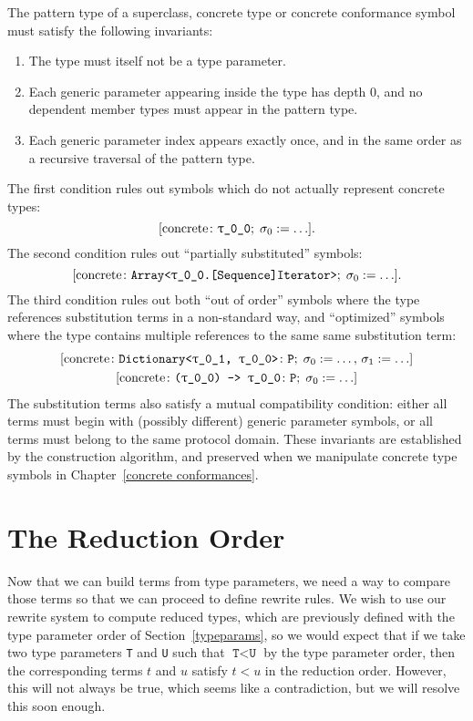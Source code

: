 \documentclass[../generics]{subfiles}
\begin{document}
The pattern type of a superclass, concrete type or concrete conformance symbol must satisfy the following invariants:
\begin{enumerate}
\item The type must itself not be a type parameter.
\item Each generic parameter appearing inside the type has depth 0, and no dependent member types must appear in the pattern type.
\item Each generic parameter index appears exactly once, and in the same order as a recursive traversal of the pattern type.
\end{enumerate}
The first condition rules out symbols which do not actually represent concrete types:
\[[\mathrm{concrete}\colon \texttt{$\uptau$\_0\_0};\; \sigma_0 := \ldots].\]
The second condition rules out ``partially substituted'' symbols:
\[[\mathrm{concrete}\colon \texttt{Array<\texttt{$\uptau$\_0\_0}.[Sequence]Iterator>};\; \sigma_0 := \ldots].\]
The third condition rules out both ``out of order'' symbols where the type references substitution terms in a non-standard way, and ``optimized'' symbols where the type contains multiple references to the same same substitution term:
\begin{gather*}
\concretesym{\texttt{Dictionary<\ttgp{0}{1}, \ttgp{0}{0}>}\colon\texttt{P};\;\sigma_0 := \ldots,\, \sigma_1 := \ldots}\\
\concretesym{\texttt{(\ttgp{0}{0}) -> \ttgp{0}{0}}\colon\texttt{P};\;\sigma_0 := \ldots}
\end{gather*}
The substitution terms also satisfy a mutual compatibility condition: either all terms must begin with (possibly different) generic parameter symbols, or all terms must belong to the same protocol domain. These invariants are established by the construction algorithm, and preserved when we manipulate concrete type symbols in Chapter~\ref{concrete conformances}.

\section{The Reduction Order}\label{reduction order}

%

Now that we can build terms from type parameters, we need a way to compare those terms so that we can proceed to define rewrite rules. We wish to use our rewrite system to compute reduced types, which are previously defined with the type parameter order of Section~\ref{typeparams}, so we would expect that if we take two type parameters \texttt{T} and \texttt{U} such that $\texttt{T}<\texttt{U}$ by the type parameter order, then the corresponding terms $t$ and $u$ satisfy $t<u$ in the reduction order. However, this will not always be true, which seems like a contradiction, but we will resolve this soon enough.
\end{document}
